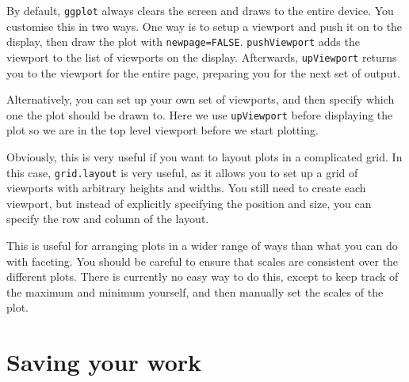 By default, {\tt ggplot} always clears the screen and draws to the entire device.  You customise this in two ways. One way is to setup a viewport and push it on to the display, then draw the plot with {\tt newpage=FALSE}. {\tt pushViewport} adds the viewport to the list of viewports on the display.   Afterwards, {\tt upViewport} returns you to the viewport for the entire page, preparing you for the next set of output.

% 


Alternatively, you can set up your own set of viewports, and then specify which one the plot should be drawn to.  Here we use {\tt upViewport} before displaying the plot so we are in the top level viewport before we start plotting.

% 


Obviously, this is very useful if you want to layout plots in a complicated grid.  In this case, {\tt grid.layout} is very useful, as it allows you to set up a grid of viewports with arbitrary heights and widths.  You still need to create each viewport, but instead of explicitly specifying the position and size, you can specify the row and column of the layout.

% 
% 
% 


This is useful for arranging plots in a wider range of ways than what you can do with faceting.   You should be careful to ensure that scales are consistent over the different plots.  There is currently no easy way to do this, except to keep track of the maximum and minimum yourself, and then manually set the scales of the plot.

\section{Saving your work} 
\label{sec:grid-save}


